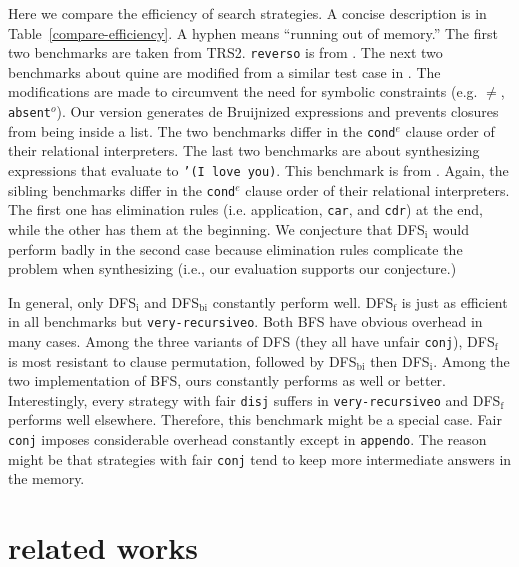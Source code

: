\documentclass[format=acmlarge, review=true, authordraft=true]{acmart}
\newcommand{\conde}{\texttt{cond$^e$}}
\newcommand{\conj}{\texttt{conj}}
\newcommand{\disj}{\texttt{disj}}
\begin{document}
Here we compare the efficiency of search strategies. A concise 
description is in Table~\ref{compare-efficiency}. A hyphen means ``running out of 
memory.'' The first two benchmarks are taken from 
TRS2. \texttt{reverso} is from 
\citet{rozplokhas2018improving}. The next two benchmarks 
about quine are modified from a similar test case in \citet{byrd2017unified}. 
The modifications are made 
to circumvent the need for symbolic constraints (e.g. $\neq$, 
\texttt{absent$^o$}). Our version generates de 
Bruijnized expressions and prevents closures from being inside a list. The two 
benchmarks differ in the \conde{} clause order of their relational 
interpreters. 
The last two 
benchmarks are about synthesizing expressions that evaluate to \texttt{'(I love 
you)}. This benchmark is from \citet{byrd2017unified}. Again, the 
sibling benchmarks differ in the \conde{} clause order of their relational 
interpreters. The first one 
has elimination rules (i.e. application, \texttt{car}, and \texttt{cdr}) at the 
end, while the other has them at the beginning. We conjecture that DFS$_\textrm{i}$ would 
perform badly in the second case because elimination rules complicate the 
problem when synthesizing (i.e., our evaluation supports our conjecture.)


In general, only DFS$_\textrm{i}$ and DFS$_\textrm{bi}$ constantly perform well. DFS$_\textrm{f}$ is just as 
efficient in all benchmarks but \texttt{very-recursiveo}. Both BFS have obvious 
overhead in many cases. Among the three variants of DFS (they all have unfair 
\conj{}), DFS$_\textrm{f}$ is most resistant to clause permutation, followed by DFS$_\textrm{bi}$ then 
DFS$_\textrm{i}$. Among the two implementation of BFS, ours constantly performs as well or 
better. Interestingly, every strategy with fair \disj{} suffers in 
\texttt{very-recursiveo} and DFS$_\textrm{f}$ performs well elsewhere. 
Therefore, this 
benchmark might be a special case. Fair \conj{} imposes considerable overhead 
constantly except in \texttt{appendo}. The reason might be that strategies with 
fair \conj{} tend to keep more intermediate answers in the memory.

\section{related works}
\end{document}
